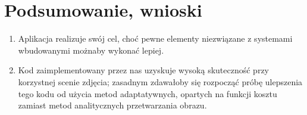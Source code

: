 \documentclass[12pt]{article}
\begin{document}
	\section{Podsumowanie, wnioski}
	\begin{enumerate}
		\item Aplikacja realizuje swój cel, choć pewne elementy niezwiązane z systemami wbudowanymi możnaby wykonać lepiej.
		\item Kod zaimplementowany przez nas uzyskuje wysoką skuteczność przy korzystnej scenie zdjęcia; zasadnym zdawałoby się rozpocząć próbę ulepszenia tego kodu od użycia metod adaptatywnych, opartych na funkcji kosztu zamiast metod analitycznych przetwarzania obrazu.
	\end{enumerate}
\end{document}
